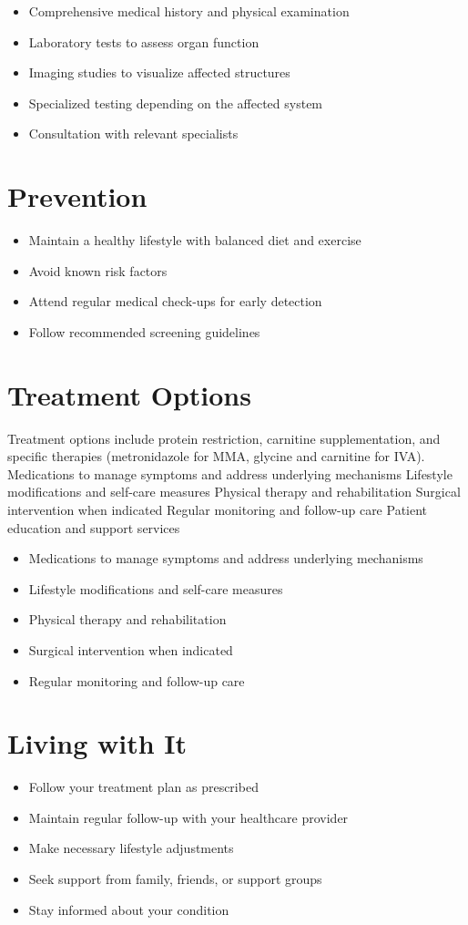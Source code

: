 \begin{itemize}[noitemsep]
  \item Comprehensive medical history and physical examination
  \item Laboratory tests to assess organ function
  \item Imaging studies to visualize affected structures
  \item Specialized testing depending on the affected system
  \item Consultation with relevant specialists
\end{itemize}
\section{Prevention}
\begin{itemize}[noitemsep]
  \item Maintain a healthy lifestyle with balanced diet and exercise
  \item Avoid known risk factors
  \item Attend regular medical check-ups for early detection
  \item Follow recommended screening guidelines
\end{itemize}
\section{Treatment Options}
Treatment options include protein restriction, carnitine supplementation, and specific therapies (metronidazole for MMA, glycine and carnitine for IVA). Medications to manage symptoms and address underlying mechanisms Lifestyle modifications and self-care measures Physical therapy and rehabilitation Surgical intervention when indicated Regular monitoring and follow-up care Patient education and support services

\begin{itemize}[noitemsep]
  \item Medications to manage symptoms and address underlying mechanisms
  \item Lifestyle modifications and self-care measures
  \item Physical therapy and rehabilitation
  \item Surgical intervention when indicated
  \item Regular monitoring and follow-up care
\end{itemize}
\section{Living with It}
\begin{itemize}[noitemsep]
  \item Follow your treatment plan as prescribed
  \item Maintain regular follow-up with your healthcare provider
  \item Make necessary lifestyle adjustments
  \item Seek support from family, friends, or support groups
  \item Stay informed about your condition
\end{itemize}
